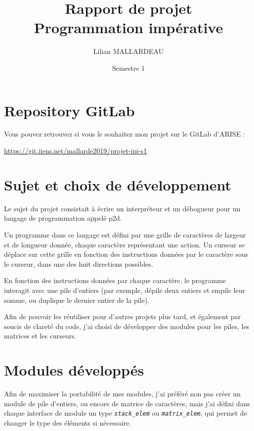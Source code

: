 \documentclass[a4paper,11pt]{article}
\title{Rapport de projet\\Programmation impérative}
\author{Lilian MALLARDEAU}
\date{Semestre 1}
\newcommand{\code}[1]{{\itshape\lstinline{#1}}}
\begin{document}
\maketitle
\tableofcontents
\break

\section*{Repository GitLab}
Vous pouvez retrouvez si vous le souhaitez mon projet sur le GitLab d'ARISE :

\url{https://git.iiens.net/mallarde2019/projet-ipi-s1}

\newpage

\section*{Sujet et choix de développement}

Le sujet du projet consistait à écrire un interpréteur et un débogueur pour un langage de programmation appelé p2d.

Un programme dans ce langage est défini par une grille de caractères de largeur et de longueur donnée, chaque caractère représentant une action.
Un curseur se déplace sur cette grille en fonction des instructions données par le caractère sous le curseur, dans une des huit directions possibles.

En fonction des instructions données par chaque caractère, le programme interagit avec une pile d'entiers (par exemple, dépile deux entiers et empile leur somme, ou duplique le dernier entier de la pile).

\bigskip

Afin de pouvoir les réutiliser pour d'autres projets plus tard, et également par soucis de clareté du code, j'ai choisi de développer des modules pour les piles, les matrices et les curseurs.


\section*{Modules développés}
Afin de maximiser la portabilité de mes modules, j'ai préféré non pas créer un module de pile d'entiers, ou encore de matrice de caractères, mais j'ai défini dans chaque interface de module un type \code{stack_elem} ou \code{matrix_elem}, qui permet de changer le type des éléments si nécessaire.
\end{document}

